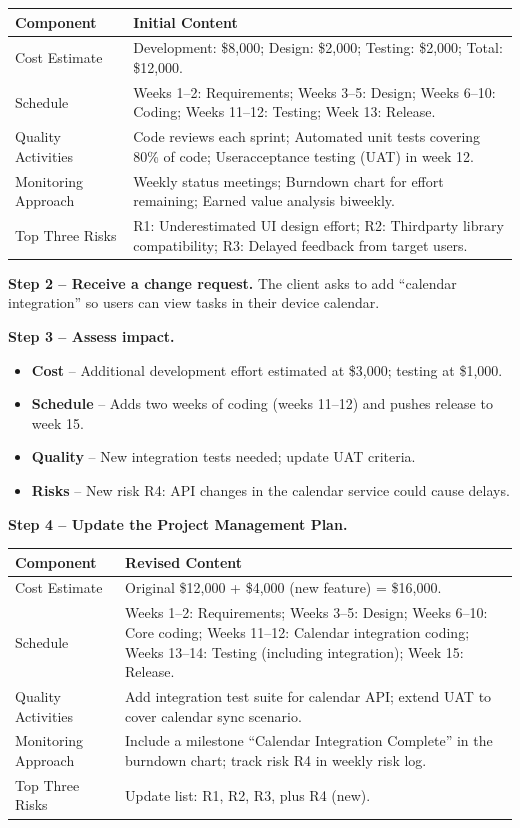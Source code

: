 \documentclass[12pt, a4paper]{article}
\begin{document}
\begin{tabular}{|p{3cm}|p{9cm}|}
\hline
\textbf{Component} & \textbf{Initial Content} \\
\hline
Cost Estimate & Development: \$8,000; Design: \$2,000; Testing: \$2,000; Total: \$12,000. \\
\hline
Schedule & Weeks 1--2: Requirements; Weeks 3--5: Design; Weeks 6--10: Coding; Weeks 11--12: Testing; Week 13: Release. \\
\hline
Quality Activities & Code reviews each sprint; Automated unit tests covering 80\% of code; Useracceptance testing (UAT) in week 12. \\
\hline
Monitoring Approach & Weekly status meetings; Burndown chart for effort remaining; Earned value analysis biweekly. \\
\hline
Top Three Risks & R1: Underestimated UI design effort; R2: Thirdparty library compatibility; R3: Delayed feedback from target users. \\
\hline
\end{tabular}

\textbf{Step 2 -- Receive a change request.}  The client asks to add ``calendar integration'' so users can view tasks in their device calendar.

\textbf{Step 3 -- Assess impact.}
\begin{itemize}
    \item \textbf{Cost} -- Additional development effort estimated at \$3,000; testing at \$1,000.
    \item \textbf{Schedule} -- Adds two weeks of coding (weeks 11--12) and pushes release to week 15.
    \item \textbf{Quality} -- New integration tests needed; update UAT criteria.
    \item \textbf{Risks} -- New risk R4: API changes in the calendar service could cause delays.
\end{itemize}

\textbf{Step 4 -- Update the Project Management Plan.}

\begin{tabular}{|p{3cm}|p{9cm}|}
\hline
\textbf{Component} & \textbf{Revised Content} \\
\hline
Cost Estimate & Original \$12,000 + \$4,000 (new feature) = \$16,000. \\
\hline
Schedule & Weeks 1--2: Requirements; Weeks 3--5: Design; Weeks 6--10: Core coding; Weeks 11--12: Calendar integration coding; Weeks 13--14: Testing (including integration); Week 15: Release. \\
\hline
Quality Activities & Add integration test suite for calendar API; extend UAT to cover calendar sync scenario. \\
\hline
Monitoring Approach & Include a milestone ``Calendar Integration Complete'' in the burndown chart; track risk R4 in weekly risk log. \\
\hline
Top Three Risks & Update list: R1, R2, R3, plus R4 (new). \\
\hline
\end{tabular}
\end{document}
